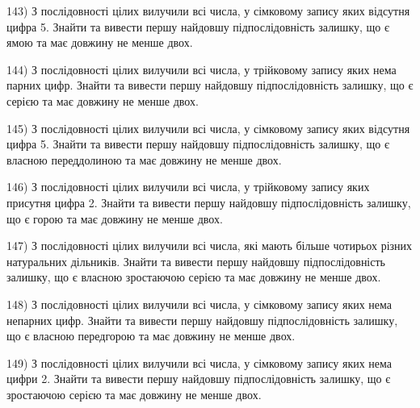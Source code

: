 \documentclass[11pt, ukrainian]{article}
\begin{document}
\par
\vspace{0.9cm}
143) \space 
З послідовності цілих вилучили всі числа, у сімковому запису яких відсутня цифра 5. Знайти та вивести першу найдовшу підпослідовність залишку, що є ямою та має довжину не менше двох.

\par
\vspace{0.9cm}
144) \space 
З послідовності цілих вилучили всі числа, у трійковому запису яких нема парних цифр. Знайти та вивести першу найдовшу підпослідовність залишку, що є серією та має довжину не менше двох.

\par
\vspace{0.9cm}
145) \space 
З послідовності цілих вилучили всі числа, у сімковому запису яких відсутня цифра 5. Знайти та вивести першу найдовшу підпослідовність залишку, що є власною переддолиною та має довжину не менше двох.

\par
\vspace{0.9cm}
146) \space 
З послідовності цілих вилучили всі числа, у трійковому запису яких присутня цифра 2. Знайти та вивести першу найдовшу підпослідовність залишку, що є горою та має довжину не менше двох.

\par
\vspace{0.9cm}
147) \space 
З послідовності цілих вилучили всі числа, які мають більше чотирьох різних натуральних дільників. Знайти та вивести першу найдовшу підпослідовність залишку, що є власною зростаючою серією та має довжину не менше двох.

\par
\vspace{0.9cm}
148) \space 
З послідовності цілих вилучили всі числа, у сімковому запису яких нема непарних цифр. Знайти та вивести першу найдовшу підпослідовність залишку, що є власною передгорою та має довжину не менше двох.

\par
\vspace{0.9cm}
149) \space 
З послідовності цілих вилучили всі числа, у сімковому запису яких нема цифри 2. Знайти та вивести першу найдовшу підпослідовність залишку, що є зростаючою серією та має довжину не менше двох.
\end{document}
